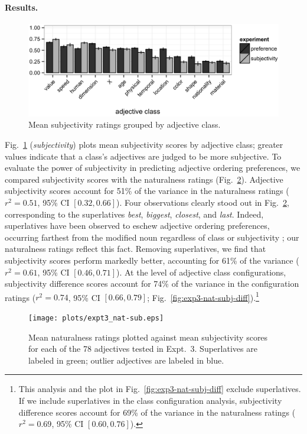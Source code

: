 \documentclass[12pt]{article}
\newcommand{\ndg}[1]{\textcolor{Green}{[ndg: #1]}}
\begin{document}
\paragraph{Results.}

\begin{figure}
	\centering\includegraphics[width=6in]{plots/expt3_results.eps}
	\caption{Mean subjectivity ratings grouped by adjective class.}\label{fig:exp3-results}
\end{figure}

Fig.~\ref{fig:exp3-results} (\emph{subjectivity}) plots mean subjectivity scores by adjective class; greater values indicate that a class's adjectives are judged to be more subjective. To evaluate the power of subjectivity in predicting adjective ordering preferences, we compared subjectivity scores with the naturalness ratings (Fig.~\ref{fig:exp3-nat-subj}). Adjective subjectivity scores account for 51\% of the variance in the naturalness ratings ($r^2=0.51$, 95\% CI $[0.32, 0.66]$). Four observations clearly stood out in Fig.~\ref{fig:exp3-nat-subj}, corresponding to the superlatives \emph{best}, \emph{biggest}, \emph{closest}, and \emph{last}. Indeed, superlatives have been observed to eschew adjective ordering preferences, occurring farthest from the modified noun regardless of class or subjectivity \citep{dixon1982}; our naturalness ratings reflect this fact. Removing superlatives, we find that subjectivity scores perform markedly better, accounting for 61\% of the variance ($r^2=0.61$, 95\% CI $[0.46, 0.71]$). At the level of adjective class configurations, subjectivity difference scores account for 74\% of the variance in the configuration ratings ($r^2=0.74$, 95\% CI $[0.66, 0.79]$; Fig.~\ref{fig:exp3-nat-subj-diff}).\footnote{This analysis and the plot in Fig.~\ref{fig:exp3-nat-subj-diff} exclude superlatives. If we include superlatives in the class configuration analysis, subjectivity difference scores account for 69\% of the variance in the naturalness ratings ($r^2=0.69$, 95\% CI $[0.60,  0.76]$).}

\begin{figure}
	\centering\texttt{[image: plots/expt3\_nat-sub.eps]}
	\caption{Mean naturalness ratings plotted against mean subjectivity scores for each of the 78 adjectives tested in Expt.~3. Superlatives are labeled in green; outlier adjectives are labeled in blue. 
		}\label{fig:exp3-nat-subj}
\end{figure}
\end{document}
